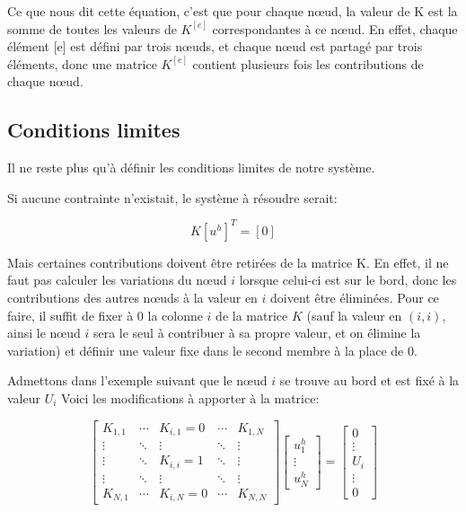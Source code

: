 \documentclass{article}
\begin{document}
Ce que nous dit cette équation, c'est que pour chaque nœud,
la valeur de K est la somme de toutes les valeurs de $K^{[e]}$
correspondantes à ce nœud. En effet, chaque élément [e] est
défini par trois nœuds, et chaque nœud est partagé par trois
éléments, donc une matrice $K^{[e]}$ contient
plusieurs fois les contributions de chaque nœud.

\subsection{Conditions limites}

Il ne reste plus qu'à définir les conditions limites de notre système.

Si aucune contrainte n'existait, le système à résoudre serait:

\begin{equation}
    K \left[u^h\right]^T = \left[0\right]
\end{equation}

Mais certaines contributions doivent être retirées de la matrice K.
En effet, il ne faut pas calculer les variations du nœud $i$ lorsque
celui-ci est sur le bord, donc les contributions des autres nœuds
à la valeur en $i$ doivent être éliminées. Pour ce faire, il suffit
de fixer à $0$ la colonne $i$ de la matrice $K$
(sauf la valeur en $(i, i)$, ainsi le nœud $i$ sera le seul à contribuer
à sa propre valeur, et on élimine la variation) et définir une valeur
fixe dans le second membre à la place de $0$.

Admettons dans l'exemple suivant que le nœud $i$ se trouve au bord et
est fixé à la valeur $U_i$
Voici les modifications à apporter à la matrice:

\begin{equation}
    \begin{bmatrix}
        K_{1,1} & \cdots & K_{i,1} = 0 & \cdots & K_{1,N} \\
        \vdots & \ddots & \vdots & \ddots & \vdots \\
        \vdots & \ddots & K_{i,i} = 1 & \ddots & \vdots \\
        \vdots & \ddots & \vdots & \ddots & \vdots \\
        K_{N,1} & \cdots & K_{i,N}=0 & \cdots & K_{N,N}
    \end{bmatrix}
    \begin{bmatrix}
        u^h_1 \\ \vdots \\ u^h_N
    \end{bmatrix}
    =
    \begin{bmatrix}
        0 \\ \vdots \\ U_i \\ \vdots \\ 0
    \end{bmatrix}
\end{equation}
\end{document}
